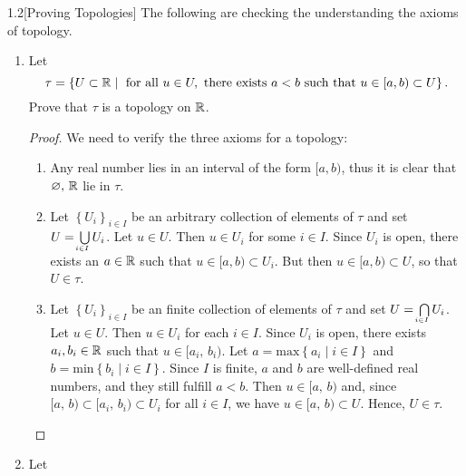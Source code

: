 \begin{cusques}{1.2}[Proving Topologies] The following are checking the understanding the axioms of topology.
\begin{enumerate}
    \item[(a).] Let 
        $$\tau = \left\{U \subset \mathbb{R} \mid \text{ for all } u \in U, \text{ there exists } a < b \text{ such that } u \in [a, b) \subset U\right\}.$$
        Prove that $\tau$ is a topology on $\mathbb{R}$.
        \begin{proof} We need to verify the three axioms for a topology:
            \begin{enumerate}
                \item[i.] Any real number lies in an interval of the form $[a, b)$, thus it is clear that $\varnothing,\, \mathbb{R}$ lie in $\tau$.
                \item[ii.] Let $\left\{U_i\right\}_{i \in I}$ be an arbitrary collection of elements of $\tau$ and set $U = \underaccent{i \in I}{\bigcup}U_i$. Let $u \in U$. Then $u \in U_i$ for some $i \in I$. Since $U_i$ is open, there exists an $a \in \mathbb{R}$ such that $u \in [a, b) \subset U_i$. But then $u \in [a, b) \subset U$, so that $U \in \tau$.
                \item[iii.] Let $\left\{U_i\right\}_{i \in I}$ be an finite collection of elements of $\tau$ and set $U = \underaccent{i \in I}{\bigcap} U_i$. Let $u \in U$. Then $u \in U_i$ for each $i \in I$. Since $U_i$ is open, there exists $a_i, b_i \in \mathbb{R}$ such that $u \in [a_i,\, b_i)$. Let $a = \text{max}\left\{a_i\mid i \in I\right\}$ and $b = \text{min}\left\{b_i \mid i \in I\right\}$. Since $I$ is finite, $a$ and $b$ are well-defined real numbers, and they still fulfill $a<b$. Then $u \in [a,\, b)$ and, since $[a,\, b) \subset [a_i,\, b_i) \subset U_i$ for all $i \in I$, we have $u \in [a,\, b) \subset U$. Hence, $U\in \tau$.
            \end{enumerate}
        \end{proof}
    \item[(b).] Let 
\end{enumerate}
\end{cusques}